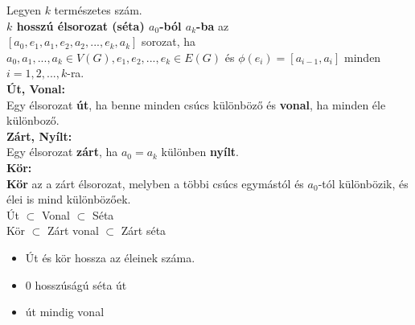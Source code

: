 \documentclass{beamer}
\newcommand{\msmallskip}{\vspace{0.3em}}
\newcommand{\mmedskip}{\vspace{0.5em}}
\newcommand{\mbigskip}{\vspace{1em}}
\begin{document}
\begin{frame}
\begin{tcolorbox}[title={Zárt, Nyílt élsorozat (Séta)}]
Legyen $k$ természetes szám.\\
\textbf{$k$ hosszú élsorozat (séta) $a_0$-ból $a_k$-ba} az\\
\msmallskip
$[a_0, e_1, a_1, e_2, a_2, ..., e_k, a_k]$ sorozat, ha $a_0, a_1, ..., a_k \in V(G), e_1, e_2, ..., e_k \in E(G)$ és ${\phi}(e_i) = [a_{i - 1}, a_i]$ minden $i = 1, 2, ..., k$-ra.\\
\mbigskip
\textbf{Út, Vonal:}\\
Egy élsorozat \textbf{út}, ha benne minden csúcs különböző és \textbf{vonal}, ha minden éle különboző.\\
\mbigskip
\textbf{Zárt, Nyílt:}\\
Egy élsorozat \textbf{zárt}, ha $a_0 = a_k$ különben \textbf{nyílt}.\\
\mbigskip
\textbf{Kör:}\\
\textbf{Kör} az a zárt élsorozat, melyben a többi csúcs egymástól és $a_0$-tól különbözik, és élei is mind különbözőek.\\
\mbigskip
Út $\subset$ Vonal $\subset$ Séta\\
\mmedskip
Kör $\subset$ Zárt vonal $\subset$ Zárt séta
\end{tcolorbox}
\begin{tcolorbox}[title={Ész}]
\begin{itemize}
\item Út és kör hossza az éleinek száma.
\item 0 hosszúságú séta út
\item út mindig vonal
\end{itemize}
\end{tcolorbox}

\end{frame}
\end{document}
